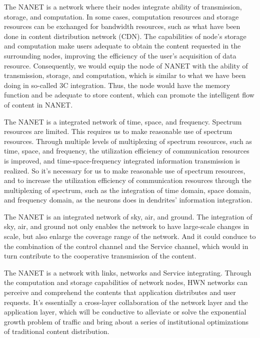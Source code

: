 \documentclass[journal,comsoc]{IEEEtran}
\begin{document}
				The NANET is a network where their nodes integrate ability of transmission, storage, and computation.
				In some cases, computation resources and storage resources can be exchanged for bandwidth resources, such as what have been done in content distribution network (CDN). 
				The capabilities of node's storage and computation make users adequate to obtain the content requested in the surrounding nodes, improving the efficiency of the user's acquisition of data resource.
				Consequently, we would equip the node of NANET with the ability of transmission, storage, and computation, which is similar to  what we have been doing in so-called 3C integration.
				Thus, the node would have the memory function and be adequate to store content, which can promote the intelligent flow of content in NANET.
				
				The NANET is a integrated network of time, space, and frequency.
				Spectrum resources are limited. This requires us to make reasonable use of spectrum resources.
				Through multiple levels of multiplexing of spectrum resources, such as time, space, and frequency, the utilization efficiency of communication resources is improved, and time-space-frequency integrated information transmission is realized.
				So it's necessary for us to make reasonable use of spectrum resources, and to increase the utilization efficiency of communication resources through the multiplexing of spectrum, such as the integration of time domain, space domain, and frequency domain, as the neurons does in dendrites' information integration.
				
				The NANET is an integrated network of sky, air, and ground. 
				The integration of sky, air, and ground not only enables the network to have large-scale changes in scale,
				but also enlarge the coverage range of the network.
				And it could conduce to the combination of the control channel and the Service channel, which would in turn contribute to the cooperative transmission of the content.
				
				The NANET is a network with links, networks and Service integrating.
				Through the computation and storage capabilities of network nodes, HWN networks can perceive and comprehend the contents that application distributes and user requests.
				It's essentially a cross-layer collaboration of the network layer and the application layer, 
				which will be conductive to alleviate or solve the exponential growth problem of traffic and bring about a series of  institutional optimizations of traditional content distribution.
				
\end{document}
